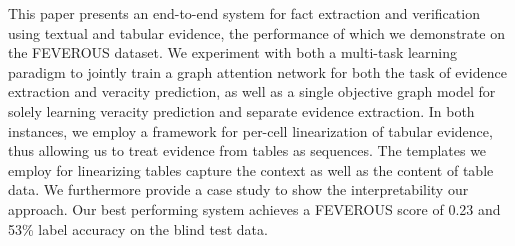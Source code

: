 This paper presents an end-to-end system for fact extraction and verification using textual and tabular evidence, the performance of which we demonstrate on the FEVEROUS dataset. We experiment with both a multi-task learning paradigm to jointly train a graph attention network for both the task of evidence extraction and veracity prediction, as well as a single objective graph model for solely learning veracity prediction and separate evidence extraction. In both instances, we employ a framework for per-cell linearization of tabular evidence, thus allowing us to treat evidence from tables as sequences. The templates we employ for linearizing tables capture the context as well as the content of table data. We furthermore provide a case study to show the interpretability our approach. Our best performing system achieves a FEVEROUS score of 0.23 and 53\% label accuracy  on the blind test data.
